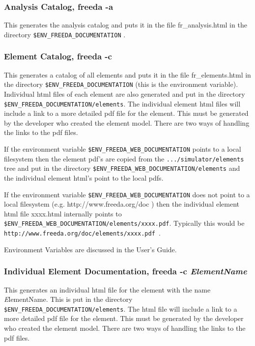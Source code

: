 \subsubsection{Analysis Catalog, freeda -a}

This generates the analysis catalog and puts it in the file fr\_analysis.html in the directory {\tt \$ENV\_FREEDA\_DOCUMENTATION} .


\subsubsection{Element Catalog, freeda -c}

This generates a catalog of all elements and puts it in the file fr\_elements.html in the directory {\tt \$ENV\_FREEDA\_DOCUMENTATION} (this is the environment variable). Individual html files of each element are also generated and put in the directory {\tt \$ENV\_FREEDA\_DOCUMENTATION/elements}.  The individual element html files will include a link to a more detailed pdf file for the element.  This must be generated by the developer who created the element model.  There are two ways of handling the links to the pdf files.

If the environment variable {\tt \$ENV\_FREEDA\_WEB\_DOCUMENTATION} points to a local filesystem then the element pdf's are copied from the {\tt .../simulator/elements} tree and put in the directory {\tt \$ENV\_FREEDA\_WEB\_DOCUMENTATION/elements} and the individual element html's point to the local pdfs.

If the environment variable {\tt \$ENV\_FREEDA\_WEB\_DOCUMENTATION} does not point to a local filesystem (e.g. http://www.freeda.org/doc ) then the individual element html file xxxx.html internally points to  {\tt \$ENV\_FREEDA\_WEB\_DOCUMENTATION/elements/xxxx.pdf}. Typically this would be {\tt http://www.freeda.org/doc/elements/xxxx.pdf }.

Environment Variables are discussed in the User's Guide.


\subsubsection{Individual Element Documentation, freeda -c \emph{ElementName}}

This generates an individual html file for the element with the name {\emph ElementName}. This is put in the directory {\tt \$ENV\_FREEDA\_DOCUMENTATION/elements}.  The  html file will include a link to a more detailed pdf file for the element.  This must be generated by the developer who created the element model.  There are two ways of handling the links to the pdf files.

